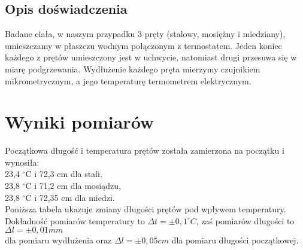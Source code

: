 \documentclass[10pt,a4paper]{article}
\newcommand{\forceindent}{\leavevmode{\parindent=3em\indent}}
\begin{document}
\subsection*{Opis doświadczenia}

\forceindent Badane ciała, w naszym przypadku 3 pręty (stalowy, mosiężny i miedziany), umieszczamy w płaszczu wodnym połączonym z termostatem. Jeden koniec każdego z prętów umieszczony jest w uchwycie, natomiast drugi przesuwa się w miarę podgrzewania. Wydłużenie każdego pręta mierzymy czujnikiem mikrometrycznym, a jego temperaturę termometrem elektrycznym.  

\section{Wyniki pomiarów}
Początkowa długość i temperatura prętów została zamierzona na początku i wynosiła:\\
23,4 $^{\circ}$C i 72,3 cm dla stali,\\
23,8 $^{\circ}$C i 71,2 cm dla mosiądzu,\\
23,8 $^{\circ}$C i 72,35 cm dla miedzi.\\

\newpage
Poniższa tabela ukazuje zmiany długości prętów pod wpływem temperatury.\\
Dokładność pomiarów temperatury to $\Delta t = \pm 0,1 ^{\circ}C$, zaś pomiarów długości to $\Delta l = \pm 0,01 mm$\\
dla pomiaru wydłużenia oraz $\Delta l = \pm 0,05 cm$ dla pomiaru długości początkowej.
\end{document}

